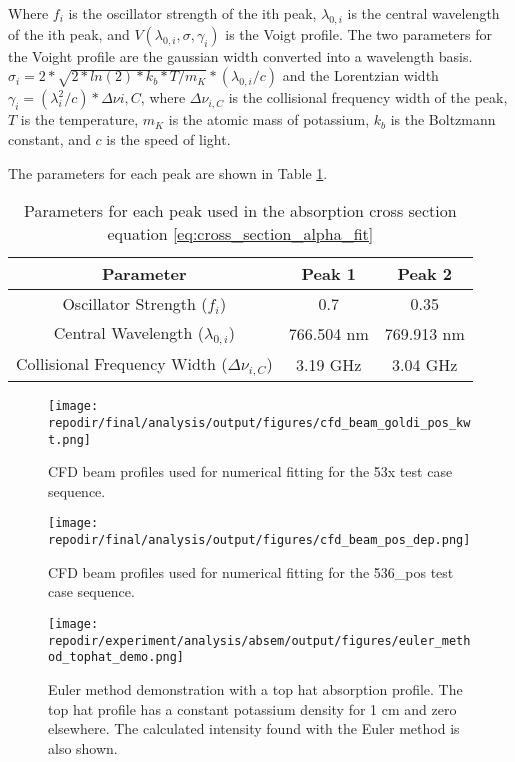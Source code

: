 Where $f_i$ is the oscillator strength of the ith peak, $\lambda_{0,i}$ is the central wavelength of the ith peak, and $V(\lambda_{0,i},\sigma,\gamma_i)$ is the Voigt profile. The two parameters for the Voight profile are the gaussian width converted into a wavelength basis.  $\sigma_i = 2*\sqrt{2*ln(2)*k_b*T/m_K}*(\lambda_{0,i}/c)$ and the Lorentzian width $\gamma_i = (\lambda_i^2/c)*\Delta \nu{i,C}$, where $\Delta \nu_{i,C}$ is the collisional frequency width of the peak, $T$ is the temperature, $m_K$ is the atomic mass of potassium, $k_b$ is the Boltzmann constant, and $c$ is the speed of light.

The parameters for each peak are shown in Table \ref{table:peak_parameters}. 

\begin{table}[H]
\centering
\begin{tabular}{|c|c|c|}
\hline
Parameter & Peak 1 & Peak 2 \\
\hline
Oscillator Strength ($f_i$) & 0.7 & 0.35 \\
Central Wavelength ($\lambda_{0,i}$) & 766.504 nm & 769.913 nm \\
Collisional Frequency Width ($\Delta \nu_{i,C}$) & 3.19 GHz & 3.04 GHz \\
\hline
\end{tabular}
\caption{Parameters for each peak used in the absorption cross section equation \ref{eq:cross_section_alpha_fit}}
\label{table:peak_parameters}
\end{table}


\begin{figure}[]
    \centering
    \texttt{[image: \\repodir/final/analysis/output/figures/cfd\_beam\_goldi\_pos\_kwt.png]}
    \caption{CFD beam profiles used for numerical fitting for the 53x test case sequence.  }
    \label{fig:SI_cfd_beam_goldi_pos_kwt}

    \texttt{[image: \\repodir/final/analysis/output/figures/cfd\_beam\_pos\_dep.png]}
    \caption{CFD beam profiles used for numerical fitting for the 536\_pos test case sequence.}
    \label{fig:SI_cfd_beam_pos_dep}
\end{figure}


\begin{figure}[]
    \centering
    \texttt{[image: \\repodir/experiment/analysis/absem/output/figures/euler\_method\_tophat\_demo.png]}
    \caption{Euler method demonstration with a top hat absorption profile. The top hat profile has a constant potassium density for 1 cm and zero elsewhere. The calculated intensity found with the Euler method is also shown.}
    \label{fig:SI_euler_method_tophat_demo}
\end{figure}

